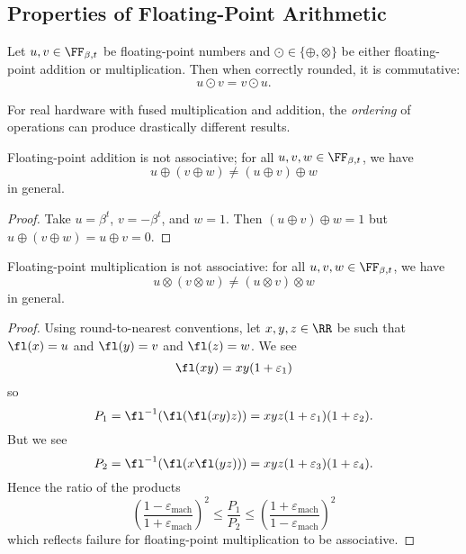 \subsection{Properties of Floating-Point Arithmetic}
\begin{thm}
  Let $u,v\in\FF_{\beta,t}$ be floating-point numbers and
  $\odot\in\{\oplus,\otimes\}$ be either floating-point addition or
  multiplication. Then when correctly rounded, it is commutative:
  \begin{equation}
    u\odot v = v\odot u.
  \end{equation}
\end{thm}

\begin{rmk}
For real hardware with fused multiplication and addition, the
\emph{ordering} of operations can produce drastically different results.
\end{rmk}

\begin{thm}
  Floating-point addition is not associative;
  for all $u,v,w\in\FF_{\beta,t}$, we have
  $$u\oplus(v\oplus w) \neq (u\oplus v)\oplus w$$
  in general.
\end{thm}
\begin{proof}
  Take $u=\beta^{t}$, $v=-\beta^{t}$, and $w=1$. Then $(u\oplus v)\oplus w=1$
  but $u\oplus(v\oplus w)=u\oplus v=0$.
\end{proof}

\begin{thm}
  Floating-point multiplication is not associative:
  for all $u,v,w\in\FF_{\beta,t}$, we have
  $$u\otimes(v\otimes w) \neq (u\otimes v)\otimes w$$
  in general.
\end{thm}
\begin{proof}
  Using round-to-nearest conventions, let $x,y,z\in\RR$ be such that
  $\fl(x)=u$ and $\fl(y)=v$ and $\fl(z)=w$. We see
  \begin{equation}
    \fl(xy) = xy(1 + \varepsilon_{1})
  \end{equation}
  so
  \begin{equation}
    P_{1}=\fl^{-1}(\fl(\fl(xy)z)) = xyz(1+\varepsilon_{1})(1 + \varepsilon_{2}).
  \end{equation}
  But we see
  \begin{equation}
    P_{2}=\fl^{-1}(\fl(x\fl(yz))) = xyz(1+\varepsilon_{3})(1 + \varepsilon_{4}).
  \end{equation}
  Hence the ratio of the products
  \begin{equation}
    \left(\frac{1 - \varepsilon_{\text{mach}}}{1 + \varepsilon_{\text{mach}}}\right)^{2}\leq\frac{P_{1}}{P_{2}}\leq\left(\frac{1 + \varepsilon_{\text{mach}}}{1 - \varepsilon_{\text{mach}}}\right)^{2}
  \end{equation}
  which reflects failure for floating-point multiplication to be associative.
\end{proof}
